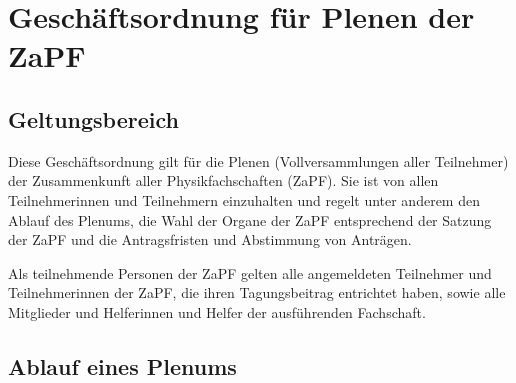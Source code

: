 \documentclass[draft,12pt,oneside]{scrreprt}
\begin{document}
\chapter*{Geschäftsordnung für Plenen der ZaPF}

\section{Geltungsbereich}

Diese Geschäftsordnung gilt für die Plenen (Vollversammlungen aller Teilnehmer)
der Zusammenkunft aller Physikfachschaften (ZaPF).
Sie ist von allen Teilnehmerinnen und Teilnehmern einzuhalten und regelt unter
anderem den Ablauf des Plenums, die Wahl der Organe der ZaPF entsprechend der
Satzung der ZaPF und die Antragsfristen und Abstimmung von Anträgen.

Als teilnehmende Personen der ZaPF gelten alle angemeldeten Teilnehmer und
Teilnehmerinnen der ZaPF, die ihren Tagungsbeitrag entrichtet haben, sowie alle
Mitglieder und Helferinnen und Helfer der ausführenden Fachschaft.

\section{Ablauf eines Plenums}
\end{document}
